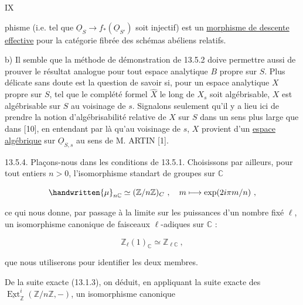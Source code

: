

IX

phisme (i.e. tel que $\underline O_S\longrightarrow f_*(\underline O_{S'})$ soit injectif) est un \uline{morphisme de descente effective} pour la catégorie fibrée des schémas abéliens relatifs.

b) Il semble que la méthode de démonstration de 13.5.2 doive permettre aussi de prouver le résultat analogue pour tout espace analytique $B$ propre sur $S$. Plus délicate sans doute est la question de savoir si, pour un espace analytique $X$ propre sur $S$, tel que le complété formel $\widehat X$ le long de $X_s$ soit algébrisable, $X$ est algébrisable sur $S$ au voisinage de $s$. Signalons seulement qu'il y a lieu ici de prendre la notion d'algébrisabilité relative de $X$ sur $S$ dans un sens plus large que dans [10], en entendant par là qu'au voisinage de $s$, $X$ provient d'un \uline{espace algébrique} sur $\underline O_{S,s}$ au sens de M. ARTIN [1].

13.5.4. Plaçons-nous dans les conditions de 13.5.1. Choisissons par ailleurs, pour tout entiers $n>0$, l'isomorphisme standart de groupes sur $\mathbb C$

\[
 \handwritten{\mu}_{n\mathbb C}\simeq(\mathbb Z/n\mathbb Z)_C\ ,\quad m\longmapsto\exp(2i\pi m/n)\ ,
\]

ce qui nous donne, par passage à la limite sur les puissances d'un nombre fixé $\ell$, un isomorphisme canonique de faisceaux $\ell$-adiques sur $\mathbb C$ :

\[
 \mathbb Z_\ell(1)_{\mathbb C}\simeq\mathbb Z_{\ell\mathbb C}\ ,
\]

que nous utiliserons pour identifier les deux membres.

De la suite exacte (13.1.3), on déduit, en appliquant la suite exacte des $\underline{\operatorname{Ext}}_{\mathbb Z}^i(\mathbb Z/n\mathbb Z,-)$, un isomorphisme canonique



